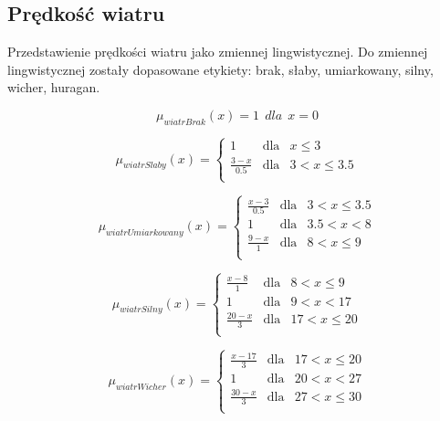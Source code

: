 \documentclass{classrep}
\begin{document}
\subsection{Prędkość wiatru}
Przedstawienie prędkości wiatru jako zmiennej lingwistycznej. Do zmiennej lingwistycznej zostały dopasowane etykiety: brak, słaby, umiarkowany, silny, wicher, huragan.

\begin{equation}
\mu _{wiatrBrak}(x) = 1 \ \ dla \ \ x = 0
\end{equation}

\begin{equation}
\mu _{wiatrSlaby}(x) = \left\{ \begin{array}{rcl}
1 & \mbox{dla} & x \leq 3 \\
\frac{3- x}{0.5} & \mbox{dla} & 3 < x \leq 3.5\\
\end{array}\right.
\end{equation}

\begin{equation}
\mu _{wiatrUmiarkowany}(x) = \left\{ \begin{array}{rcl}
\frac{x - 3}{0.5} & \mbox{dla} & 3 < x \leq 3.5\\
1 & \mbox{dla} & 3.5 < x < 8\\
\frac{9 - x}{1} & \mbox{dla} & 8 < x \leq 9\\
\end{array}\right.
\end{equation}

\begin{equation}
\mu _{wiatrSilny}(x) = \left\{ \begin{array}{rcl}
\frac{x - 8}{1} & \mbox{dla} & 8 < x \leq 9\\
1 & \mbox{dla} & 9 < x < 17\\
\frac{20 - x}{3} & \mbox{dla} & 17 < x \leq 20\\
\end{array}\right.
\end{equation}

\begin{equation}
\mu _{wiatrWicher}(x) = \left\{ \begin{array}{rcl}
\frac{x - 17}{3} & \mbox{dla} & 17 < x \leq 20\\
1 & \mbox{dla} & 20 < x < 27\\
\frac{30 - x}{3} & \mbox{dla} & 27 < x \leq 30\\
\end{array}\right.
\end{equation}
\end{document}

